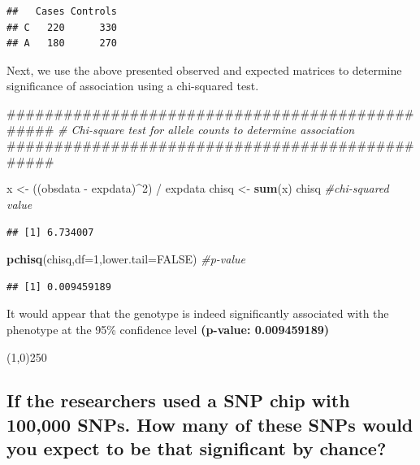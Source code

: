 \documentclass[]{article}
\newenvironment{Shaded}{\begin{snugshade}}{\end{snugshade}}
\newcommand{\KeywordTok}[1]{\textcolor[rgb]{0.13,0.29,0.53}{\textbf{{#1}}}}
\newcommand{\DataTypeTok}[1]{\textcolor[rgb]{0.13,0.29,0.53}{{#1}}}
\newcommand{\DecValTok}[1]{\textcolor[rgb]{0.00,0.00,0.81}{{#1}}}
\newcommand{\StringTok}[1]{\textcolor[rgb]{0.31,0.60,0.02}{{#1}}}
\newcommand{\CommentTok}[1]{\textcolor[rgb]{0.56,0.35,0.01}{\textit{{#1}}}}
\newcommand{\OtherTok}[1]{\textcolor[rgb]{0.56,0.35,0.01}{{#1}}}
\newcommand{\NormalTok}[1]{{#1}}
\begin{document}
\begin{verbatim}
##   Cases Controls
## C   220      330
## A   180      270
\end{verbatim}

Next, we use the above presented observed and expected matrices to
determine significance of association using a chi-squared test.

\begin{Shaded}
\begin{Highlighting}[]
\NormalTok{################################################}
\CommentTok{# Chi-square test for allele counts to determine association}
\NormalTok{################################################}

\NormalTok{x <-}\StringTok{ }\NormalTok{((obsdata -}\StringTok{ }\NormalTok{expdata)^}\DecValTok{2}\NormalTok{) /}\StringTok{ }\NormalTok{expdata}
\NormalTok{chisq <-}\StringTok{ }\KeywordTok{sum}\NormalTok{(x)}
\NormalTok{chisq                               }\CommentTok{#chi-squared value}
\end{Highlighting}
\end{Shaded}

\begin{verbatim}
## [1] 6.734007
\end{verbatim}

\begin{Shaded}
\begin{Highlighting}[]
\KeywordTok{pchisq}\NormalTok{(chisq,}\DataTypeTok{df=}\DecValTok{1}\NormalTok{,}\DataTypeTok{lower.tail=}\OtherTok{FALSE}\NormalTok{) }\CommentTok{#p-value}
\end{Highlighting}
\end{Shaded}

\begin{verbatim}
## [1] 0.009459189
\end{verbatim}

It would appear that the genotype is indeed significantly associated
with the phenotype at the 95\% confidence level \textbf{(p-value:
0.009459189)}

\begin{center}
\line(1,0){250}
\end{center}

\subsection{If the researchers used a SNP chip with 100,000 SNPs. How
many of these SNPs would you expect to be that significant by
chance?}\label{if-the-researchers-used-a-snp-chip-with-100000-snps.-how-many-of-these-snps-would-you-expect-to-be-that-significant-by-chance}
\end{document}
